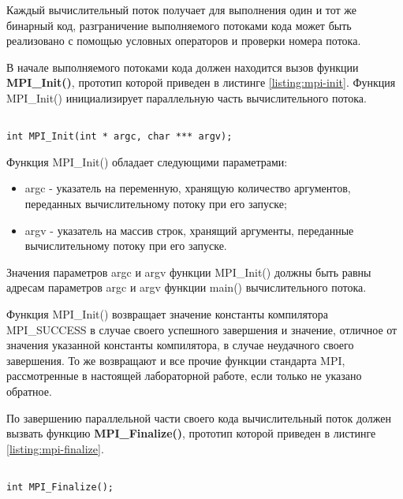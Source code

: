 Каждый вычислительный поток получает для выполнения один и тот же бинарный код, разграничение выполняемого потоками кода может быть реализовано с помощью условных операторов и проверки номера потока.

В начале выполняемого потоками кода должен находится вызов функции {\bf MPI\_Init()}, прототип которой приведен в листинге \ref{listing:mpi-init}. Функция MPI\_Init() инициализирует параллельную часть вычислительного потока.

\begin{lstlisting}

int MPI_Init(int * argc, char *** argv);

\end{lstlisting}
\mylistingend

Функция MPI\_Init() обладает следующими параметрами:

\begin{itemize}

	\item argc - указатель на переменную, хранящую количество аргументов, переданных вычислительному потоку при его запуске;
	\item argv - указатель на массив строк, хранящий аргументы, переданные вычислительному потоку при его запуске.

\end{itemize}

Значения параметров argc и argv функции MPI\_Init() должны быть равны адресам параметров argc и argv функции main() вычислительного потока.

Функция MPI\_Init() возвращает значение константы компилятора MPI\_SUCCESS в случае своего успешного завершения и значение, отличное от значения указанной константы компилятора, в случае неудачного своего завершения. То же возвращают и все прочие функции стандарта MPI, рассмотренные в настоящей лабораторной работе, если только не указано обратное.

По завершению параллельной части своего кода вычислительный поток должен вызвать функцию {\bf MPI\_Finalize()}, прототип которой приведен в листинге \ref{listing:mpi-finalize}.

\begin{lstlisting}

int MPI_Finalize();

\end{lstlisting}
\mylistingend

